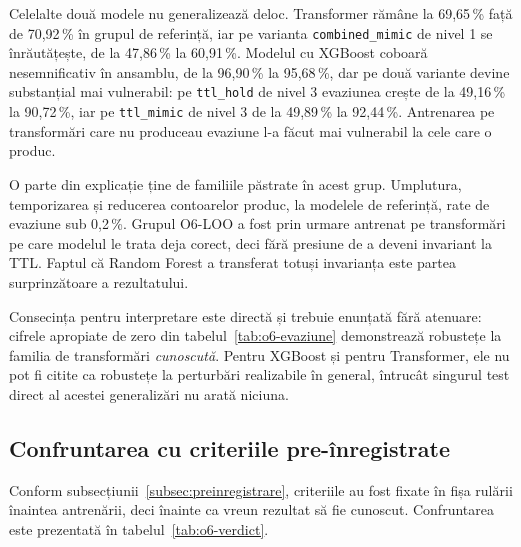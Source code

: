 Celelalte două modele nu generalizează deloc. Transformer rămâne la 69,65\,\% față de 70,92\,\% în grupul de referință, iar pe varianta \verb|combined_mimic| de nivel 1 se înrăutățește, de la 47,86\,\% la 60,91\,\%. Modelul cu XGBoost coboară nesemnificativ în ansamblu, de la 96,90\,\% la 95,68\,\%, dar pe două variante devine substanțial mai vulnerabil: pe \verb|ttl_hold| de nivel 3 evaziunea crește de la 49,16\,\% la 90,72\,\%, iar pe \verb|ttl_mimic| de nivel 3 de la 49,89\,\% la 92,44\,\%. Antrenarea pe transformări care nu produceau evaziune l-a făcut mai vulnerabil la cele care o produc.

O parte din explicație ține de familiile păstrate în acest grup. Umplutura, temporizarea și reducerea contoarelor produc, la modelele de referință, rate de evaziune sub 0,2\,\%. Grupul O6-LOO a fost prin urmare antrenat pe transformări pe care modelul le trata deja corect, deci fără presiune de a deveni invariant la TTL. Faptul că Random Forest a transferat totuși invarianța este partea surprinzătoare a rezultatului.

Consecința pentru interpretare este directă și trebuie enunțată fără atenuare: cifrele apropiate de zero din tabelul~\ref{tab:o6-evaziune} demonstrează robustețe la familia de transformări \emph{cunoscută}. Pentru XGBoost și pentru Transformer, ele nu pot fi citite ca robustețe la perturbări realizabile în general, întrucât singurul test direct al acestei generalizări nu arată niciuna.

\subsection{Confruntarea cu criteriile pre-înregistrate}\label{subsec:o6-verdict}

Conform subsecțiunii~\ref{subsec:preinregistrare}, criteriile au fost fixate în fișa rulării înaintea antrenării, deci înainte ca vreun rezultat să fie cunoscut. Confruntarea este prezentată în tabelul~\ref{tab:o6-verdict}.

